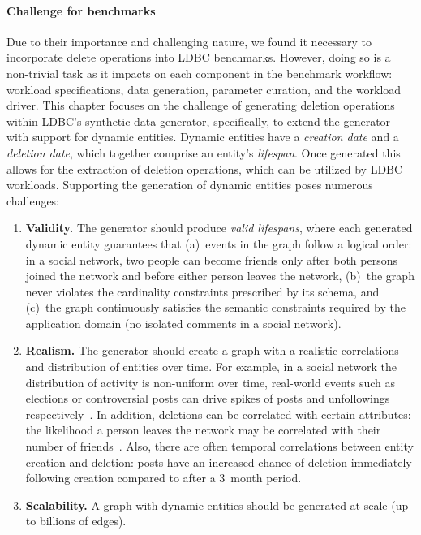 \paragraph{Challenge for benchmarks}
Due to their importance and challenging nature, we found it necessary to incorporate delete operations into LDBC benchmarks.
However, doing so is a non-trivial task as it impacts on each component in the benchmark workflow:
workload specifications, data generation, parameter curation, and the workload driver.
This chapter focuses on the challenge of generating deletion operations within LDBC's synthetic data generator, specifically, to extend the generator with support for dynamic entities.
Dynamic entities have a \emph{creation date} and a \emph{deletion date}, which together comprise an entity's \emph{lifespan}.
Once generated this allows for the extraction of deletion operations, which can be utilized by LDBC workloads. 
Supporting the generation of dynamic entities poses numerous challenges:
\begin{enumerate}
\item \textbf{Validity.} The generator should produce \emph{valid lifespans},
where each generated dynamic entity guarantees that
(a)~events in the graph follow a logical order: \eg in a social network, two people can become friends only after both persons joined the network and before either person leaves the network,
(b)~the graph never violates the cardinality constraints prescribed by its schema, and
(c)~the graph continuously satisfies the semantic constraints required by the application domain (\eg no isolated comments in a social network).
\item \textbf{Realism.} The generator should create a graph with a realistic correlations and distribution of entities over time.
For example, in a social network the distribution of activity is non-uniform over time, real-world events such as elections or controversial posts %
can drive spikes of posts and unfollowings respectively~\cite{DBLP:conf/www/MyersL14}.
In addition, deletions can be correlated with certain attributes: \eg the likelihood a person leaves the network may be correlated with their number of friends~\cite{Lorincz2019}.
Also, there are often temporal correlations between entity creation and deletion: \eg posts have an increased chance of deletion immediately following creation compared to after a 3~month period.
\item \textbf{Scalability.} A graph with dynamic entities should be generated at scale (up to billions of edges).
\end{enumerate}

